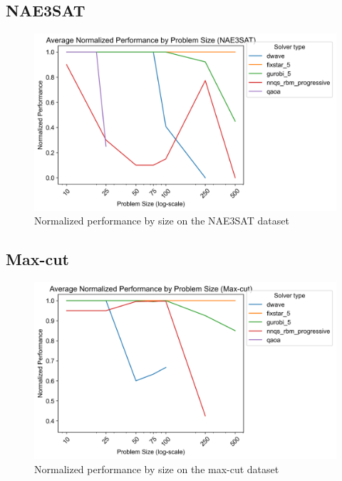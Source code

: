 \subsection{NAE3SAT}
\begin{figure}[!h]
    \centering
    \includegraphics[width=1\linewidth]{images/nae3sat_normalized_performance_all.png}
    \caption{Normalized performance by size on the NAE3SAT dataset}
    \label{all-nae3sat-size}
\end{figure}

\subsection{Max-cut}
\begin{figure}[!h]
    \centering
    \includegraphics[width=1\linewidth]{images/maxcut_normalized_performance_all.png}
    \caption{Normalized performance by size on the max-cut dataset}
    \label{all-maxcut-size}
\end{figure}

